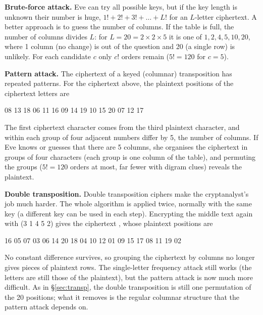 \textbf{Brute-force attack.} Eve can try all possible keys, but if the key length is unknown their number is huge, $1! + 2! + 3! + \dots + L!$ for an $L$-letter ciphertext. A better approach is to guess the number of columns. If the table is full, the number of columns divides $L$: for $L = 20 = 2 \times 2 \times 5$ it is one of $1, 2, 4, 5, 10, 20$, where 1 column (no change) is out of the question and 20 (a single row) is unlikely. For each candidate $c$ only $c!$ orders remain ($5! = 120$ for $c = 5$).

\textbf{Pattern attack.} The ciphertext of a keyed (columnar) transposition has repeated patterns. For the ciphertext  above, the plaintext positions of the ciphertext letters are
\begin{center}\small{} 08 13 18  06 11 16  09 14 19  10 15 20  07 12 17
\end{center}
The first ciphertext character comes from the third plaintext character, and within each group of four adjacent numbers differ by 5, the number of columns. If Eve knows or guesses that there are 5 columns, she organises the ciphertext in groups of four characters (each group is one column of the table), and permuting the groups ($5! = 120$ orders at most, far fewer with digram clues) reveals the plaintext.

\textbf{Double transposition.} Double transposition ciphers make the cryptanalyst's job much harder. The whole algorithm is applied twice, normally with the same key (a different key can be used in each step). Encrypting the middle text  again with (3 1 4 5 2) gives the ciphertext \textbf{}, whose plaintext positions are
\begin{center}\small{} 16 05 07 03 06 14 20 18 04 10 12 01 09 15 17 08 11 19 02
\end{center}
No constant difference survives, so grouping the ciphertext by columns no longer gives pieces of plaintext rows. The single-letter frequency attack still works (the letters are still those of the plaintext), but the pattern attack is now much more difficult. As in \S\ref{sec:transp}, the double transposition is still one permutation of the 20 positions; what it removes is the regular columnar structure that the pattern attack depends on.

